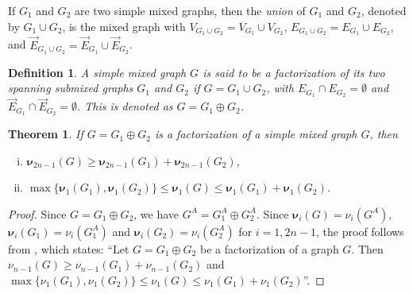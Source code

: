 \documentclass[12pt]{article}
\numberwithin{equation}{section}
\newtheorem{thm}{Theorem}[section]
\newtheorem{defn}{Definition}[section]
\begin{document}
	If $G_1$ and $G_2$ are two simple mixed graphs, then the \textit{union} of $G_1$ and $G_2$, denoted by $G_1\cup G_2$, is the mixed graph with $V_{G_1\cup G_2}=V_{G_1}\cup V_{G_2}$, $E_{G_1\cup G_2}=E_{G_1}\cup E_{G_2}$, and $\vec{E}_{G_1\cup G_2}=\vec{E}_{G_1}\cup \vec{E}_{G_2}$.
	\begin{defn}\normalfont
	A simple mixed graph $ G $ is said to be a \textit{factorization} of its two spanning submixed graphs $ G_1 $ and $ G_2 $ if $ G = G_1 \cup G_2 $, with $ E_{G_1} \cap E_{G_2} = \emptyset $ and $ \vec{E}_{G_1} \cap \vec{E}_{G_2} = \emptyset $. This is denoted as $ G = G_1 \oplus G_2 $.
	\end{defn}
	\begin{thm}\label{thm-factorization ineq}
		If $G=G_1\oplus G_2$ is a factorization of a simple mixed graph $G$, then 
		\begin{enumerate}[(i)]
			\item $\bm{\nu}_{2n-1}(G)\geq\bm{\nu}_{2n-1}(G_1)+\bm{\nu}_{2n-1}(G_2)$,
			\item $\max\{\bm{\nu}_{1}(G_1),\bm{\nu}_{1}(G_2)\}\leq\bm{\nu}_{1}(G)\leq\bm{\nu}_{1}(G_1)+\bm{\nu}_{1}(G_2)$.
		\end{enumerate} 
	\end{thm}
	\begin{proof}
		Since $G=G_1\oplus G_2$, we have $G^A=G_1^A\oplus G_2^A$.  Since $\bm{\nu}_{i}(G)=\nu_{i}(G^A)$, $\bm{\nu}_{i}(G_1)=\nu_{i}(G_1^A)$ and $\bm{\nu}_{i}(G_2)=\nu_{i}(G_2^A)$ for $i=1,2n-1$, the proof follows from \cite[Theorem~3.3]{Mohar1991laplacian}, which states: ``Let $G=G_1\oplus G_2$ be a factorization of a graph $G$. Then  $\nu_{n-1}(G)\geq\nu_{n-1}(G_1)+\nu_{n-1}(G_2)$ and $\max\{\nu_{1}(G_1),\nu_{1}(G_2)\}\leq\nu_{1}(G)\leq\nu_{1}(G_1)+\nu_{1}(G_2)$''.
	\end{proof}
\end{document}
